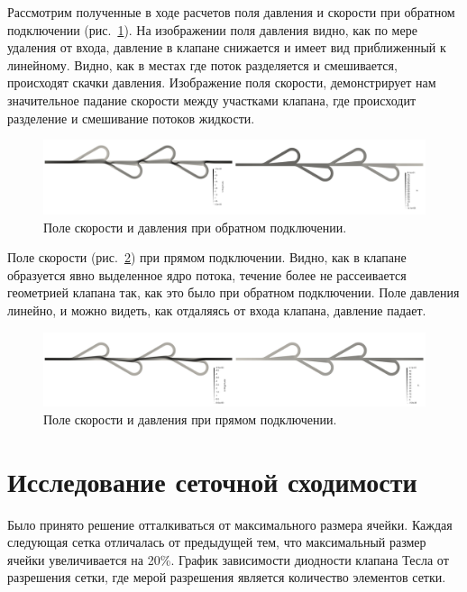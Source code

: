\documentclass[10pt,a4paper]{book}
\begin{document}
    Рассмотрим полученные в ходе расчетов поля давления и скорости при обратном подключении (рис.~\ref{fig:UPFieldsReverse}). На изображении поля давления видно, как по мере удаления от входа, давление в клапане снижается и имеет вид приближенный к линейному. Видно, как в местах где поток разделяется и смешивается, происходят скачки давления. Изображение поля скорости, демонстрирует нам значительное падание скорости между участками клапана, где происходит разделение и смешивание потоков жидкости.
    
    \begin{figure}[H]
        \centering
        \includegraphics[width = 1\linewidth]{UPFieldsReverse}
        \caption{Поле скорости и давления при обратном подключении.}
        \label{fig:UPFieldsReverse}
    \end{figure}
    
    Поле скорости (рис.~\ref{fig:UPFieldsDirect}) при прямом подключении. Видно, как в клапане образуется явно выделенное ядро потока, течение более не рассеивается геометрией клапана так, как это было при обратном подключении. Поле давления линейно, и можно видеть, как отдаляясь от входа клапана, давление падает.
    
    \begin{figure}[H]
        \centering
        \includegraphics[width = 1\linewidth]{UPFieldsDirect}
        \caption{Поле скорости и давления при прямом подключении.}
        \label{fig:UPFieldsDirect}
    \end{figure}   
    
    \section{Исследование сеточной сходимости}
    Было принято решение отталкиваться от максимального размера ячейки. Каждая следующая сетка отличалась от предыдущей тем, что максимальный размер ячейки увеличивается на 20\%. График зависимости диодности клапана Тесла от разрешения сетки, где мерой разрешения является количество элементов сетки.
\end{document}
